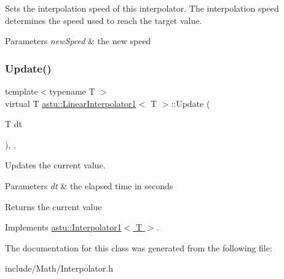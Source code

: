 Sets the interpolation speed of this interpolator. The interpolation speed determines the speed used to reach the target value.


\begin{DoxyParams}{Parameters}
{\em new\+Speed} & the new speed \\
\hline
\end{DoxyParams}
\mbox{\label{classastu_1_1LinearInterpolator1_a87cd49a1e029c8a4e7ca116c4dfae900}} 
\subsubsection{\texorpdfstring{Update()}{Update()}}
{\footnotesize\ttfamily template$<$typename T $>$ \\
virtual T \hyperlink{classastu_1_1LinearInterpolator1}{astu\+::\+Linear\+Interpolator1}$<$ T $>$\+::Update (\begin{DoxyParamCaption}\item[{T}]{dt }\end{DoxyParamCaption})\hspace{0.3cm}{\ttfamily [inline]}, {\ttfamily [override]}, {\ttfamily [virtual]}}

Updates the current value.


\begin{DoxyParams}{Parameters}
{\em dt} & the elapsed time in seconds \\
\hline
\end{DoxyParams}
\begin{DoxyReturn}{Returns}
the current value 
\end{DoxyReturn}


Implements \hyperlink{classastu_1_1Interpolator1_a3507ba0a1fcb2f38539793f1906d8000}{astu\+::\+Interpolator1$<$ T $>$}.



The documentation for this class was generated from the following file\+:\begin{DoxyCompactItemize}
\item 
include/\+Math/Interpolator.\+h\end{DoxyCompactItemize}

